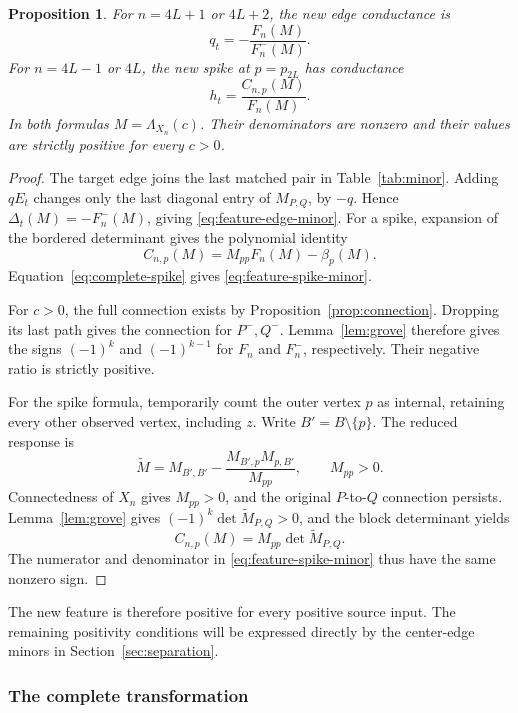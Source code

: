\documentclass[11pt]{article}
\newtheorem{proposition}[theorem]{Proposition}
\theoremstyle{definition}
\begin{document}
\begin{proposition}
\label{prop:feature-minors}
For \(n=4L+1\) or \(4L+2\), the new edge conductance is
\begin{equation}
 q_t=-\frac{F_n(M)}{F_n^-(M)}.
 \label{eq:feature-edge-minor}
\end{equation}
For \(n=4L-1\) or \(4L\), the new spike at \(p=p_{2L}\) has conductance
\begin{equation}
 h_t=\frac{C_{n,p}(M)}{F_n(M)}.
 \label{eq:feature-spike-minor}
\end{equation}
In both formulas \(M=\Lambda_{X_n}(c)\). Their denominators are
nonzero and their values are strictly positive for every \(c>0\).
\end{proposition}
\begin{proof}
The target edge joins the last matched pair in
Table~\ref{tab:minor}. Adding \(qE_t\) changes only the last
diagonal entry of \(M_{P,Q}\), by \(-q\).
Hence \(\Delta_t(M)=-F_n^-(M)\), giving
\eqref{eq:feature-edge-minor}.
For a spike, expansion of the bordered determinant gives the
polynomial identity
\[
 C_{n,p}(M)=M_{pp}F_n(M)-\beta_p(M).
\]
Equation~\eqref{eq:complete-spike} gives
\eqref{eq:feature-spike-minor}.

For \(c>0\), the full connection exists by
Proposition~\ref{prop:connection}. Dropping its last path gives the
connection for \(P^-,Q^-\). Lemma~\ref{lem:grove} therefore gives
the signs \((-1)^k\) and \((-1)^{k-1}\) for \(F_n\) and \(F_n^-\),
respectively. Their negative ratio is strictly positive.

For the spike formula, temporarily count the outer vertex \(p\)
as internal, retaining every other observed vertex, including \(z\).
Write \(B'=B\setminus\{p\}\). The reduced response is
\[
 \widetilde M=
 M_{B',B'}
 -\frac{M_{B',p}M_{p,B'}}{M_{pp}},
 \qquad M_{pp}>0.
\]
Connectedness of \(X_n\) gives \(M_{pp}>0\), and the original
\(P\)-to-\(Q\) connection persists.
Lemma~\ref{lem:grove} gives
\((-1)^k\det\widetilde M_{P,Q}>0\), and the block determinant yields
\[
 C_{n,p}(M)=M_{pp}\det\widetilde M_{P,Q}.
\]
The numerator and denominator in
\eqref{eq:feature-spike-minor} thus have the same nonzero sign.
\end{proof}

The new feature is therefore positive for every positive source input.
The remaining positivity conditions will be expressed directly by the
center-edge minors in Section~\ref{sec:separation}.

\subsubsection{The complete transformation}
\end{document}
